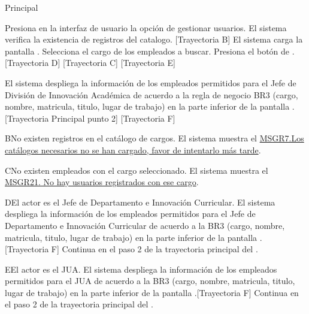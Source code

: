 \begin{UCtrayectoria}{Principal}
    
    \UCpaso[\UCactor] Presiona en la interfaz de usuario  la opción de gestionar usuarios. 
    \UCpaso  El sistema verifica la existencia de registros del catalogo. [Trayectoria B] 
    \UCpaso El sistema carga la pantalla  .
    \UCpaso[\UCactor] Selecciona el cargo de los empleados a buscar. 
    \UCpaso[\UCactor]  Presiona el botón de . [Trayectoria D] [Trayectoria C] [Trayectoria E]
    
    \UCpaso El sistema despliega la información de los empleados permitidos para el Jefe de División de Innovación Académica de acuerdo a la regla de negocio BR3 (cargo, nombre, matricula, titulo, lugar de trabajo) en la parte inferior de la pantalla . [Trayectoria Principal punto 2] [Trayectoria F]
\end{UCtrayectoria}

\begin{UCtrayectoriaA}{B}{No existen registros en el catálogo de cargos.}
    \UCpaso     El sistema muestra el \hyperref[MSGR7]{MSGR7.Los catálogos necesarios no se han cargado, favor de intentarlo más tarde}.
\end{UCtrayectoriaA}

\begin{UCtrayectoriaA}{C}{No existen  empleados con el cargo seleccionado.}
    \UCpaso     El sistema muestra el \hyperref[MSGR21]{MSGR21. No hay usuarios registrados con ese cargo}.
\end{UCtrayectoriaA}

\begin{UCtrayectoriaA}{D}{El actor es el Jefe de Departamento e Innovación Curricular.}
 \UCpaso El sistema despliega la información  de los empleados permitidos para el Jefe de Departamento e Innovación Curricular de acuerdo a la BR3 (cargo, nombre, matricula, titulo, lugar de trabajo) en la parte inferior de la pantalla . [Trayectoria F]
  \UCpaso Continua en el paso 2 de la trayectoria principal del .
\end{UCtrayectoriaA}

\begin{UCtrayectoriaA}{E}{El actor es el JUA.}
 \UCpaso El sistema despliega la información  de los empleados permitidos para el JUA de acuerdo a la BR3 (cargo, nombre, matricula, titulo, lugar de trabajo) en la parte inferior de la pantalla .[Trayectoria F]
 \UCpaso Continua en el paso 2 de la trayectoria principal del .
\end{UCtrayectoriaA}

